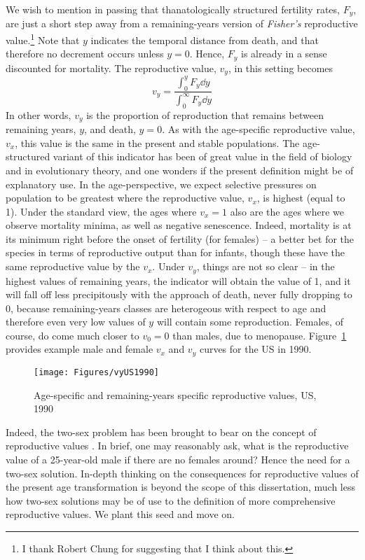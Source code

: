 \FloatBarrier
\label{sec:fisher}
We wish to mention in passing that thanatologically structured fertility rates,
$F_y$, are just a short step away from a remaining-years version of
\textit{Fisher's} \citeyear{fisher1999genetical} reproductive value.\footnote{I
thank Robert Chung for suggesting that I think about this.} Note that $y$ indicates the
temporal distance from death, and that therefore no decrement occurs unless $y=0$. 
Hence, $F_y$ is already in a sense discounted for mortality. The
reproductive value, $v_y$, in this setting becomes
\begin{equation}
\label{eq:eyfisher}
v_y = \frac{\int _0 ^y F_y \dd y}{\int _0 ^\infty F_y \dd y} 
\end{equation}
In other words, $v_y$ is the proportion of reproduction that remains between
remaining years, $y$, and death, $y=0$. As with the age-specific
reproductive value, $v_x$, this value is the same in the present and stable
populations. The age-structured variant of this indicator has been of great 
value in the field of biology and in evolutionary theory, and one wonders
if the present definition might be of explanatory use. In the age-perspective,
we expect selective pressures on population to be greatest where the reproductive value,
$v_x$, is highest (equal to 1). Under the standard view, the ages
where $v_x = 1$ also are the ages where we observe mortality minima, as well as
negative senescence. Indeed, mortality is at its minimum right before the
onset of fertility (for females) -- a better bet for the species in terms of
reproductive output than for infants, though these have the same reproductive
value by the $v_x$. Under $v_y$, things are not so clear -- in the highest
values of remaining years, the indicator will obtain the value of 1, and it will
fall off less precipitously with the approach of death, never fully dropping to
0, because remaining-years classes are heterogeous with respect to age
and therefore even very low values of $y$ will contain some reproduction.
Females, of course, do come much closer to $v_0 = 0$ than males, due to
menopause. Figure~\ref{fig:vyUS1990} provides example male and female $v_x$ and
$v_y$ curves for the US in 1990.

 \begin{figure}
                \centering
                \caption{Age-specific and remaining-years specific reproductive
                values, US, 1990}
                \texttt{[image: Figures/vyUS1990]}
                \label{fig:vyUS1990}
\end{figure}

Indeed, the two-sex problem has been brought to bear on the concept of
reproductive values \citep{samuelson1977generalizing}. In brief, one may
reasonably ask, what is the reproductive value of a 25-year-old male if there
are no females around? Hence the need for a two-sex solution. In-depth
thinking on the consequences for reproductive values of the present age
transformation is beyond the scope of this dissertation, much less how two-sex
solutions may be of use to the definition of more comprehensive reproductive
values. We plant this seed and move on.

\FloatBarrier
